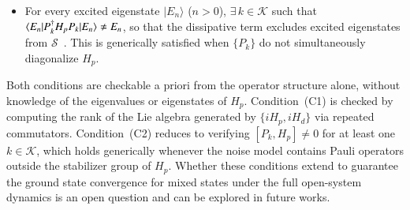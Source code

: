 \documentclass[10pt, superscriptaddress,aps,pra,twocolumn,showpacs,nofootinbib, longbibliography, notitlepage,floatfix]{revtex4-2}
\begin{document}
{\begin{itemize}
    \item[\textbf{(C2)}] For every excited eigenstate $|E_n\rangle$ 
    ($n > 0$), $\exists\, k \in \mathcal{K}$ such that 
    $\braket{E_n|P_k^\dagger H_p P_k|E_n} \neq E_n$, so that the 
    dissipative term excludes excited eigenstates from 
    $\mathcal{S}$~\cite{Wang2010}. This is generically satisfied when 
    $\{P_k\}$ do not simultaneously diagonalize $H_p$.
\end{itemize}
}
{Both conditions are checkable a priori from the operator structure alone, without knowledge of the eigenvalues or eigenstates of $H_p$. Condition~(C1) is checked by computing the rank of the Lie algebra generated by $\{iH_p,iH_d\}$ via repeated commutators. Condition~(C2) reduces to verifying $[P_k,H_p]\neq 0$ for at least one $k\in\mathcal{K}$, which holds generically whenever the noise model contains Pauli operators outside the stabilizer group of $H_p$. Whether these conditions extend to guarantee the ground state convergence for mixed states under the full open-system dynamics is an open question and can be explored in future works.}
\end{document}
